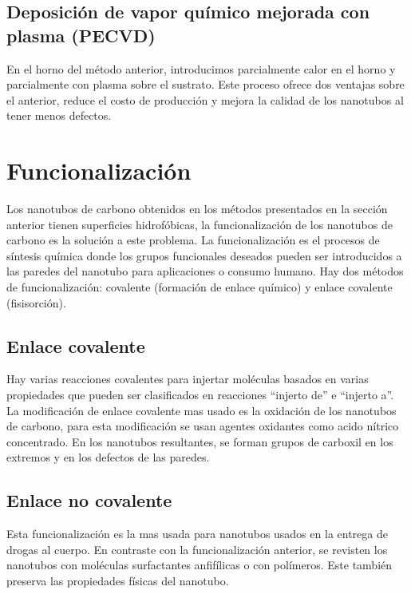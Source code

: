 \subsection{Deposición de vapor químico mejorada con plasma (PECVD)}

En el horno del método anterior, introducimos parcialmente calor en el horno y parcialmente con plasma sobre el sustrato. Este proceso ofrece dos ventajas sobre el anterior, reduce el costo de producción y mejora la calidad de los nanotubos al tener menos defectos.

\section{Funcionalización}

Los nanotubos de carbono obtenidos en los métodos presentados en la sección anterior tienen superficies hidrofóbicas, la funcionalización de los nanotubos de carbono es la solución a este problema. La funcionalización es el procesos de síntesis química donde los grupos funcionales deseados pueden ser introducidos a las paredes del nanotubo para aplicaciones o consumo humano. Hay dos métodos de funcionalización: covalente (formación de enlace químico) y enlace covalente (fisisorción)\cite{KAUR2019}.

\subsection{Enlace covalente}

Hay varias reacciones covalentes para injertar moléculas basados en varias propiedades que pueden ser clasificados en reacciones ``injerto de'' e ``injerto a''. La modificación de enlace covalente mas usado es la oxidación de los nanotubos de carbono, para esta modificación se usan agentes oxidantes como acido nítrico concentrado. En los nanotubos resultantes, se forman grupos de carboxil en los extremos y en los defectos de las paredes.

\subsection{Enlace no covalente}

Esta funcionalización es la mas usada para nanotubos usados en la entrega de drogas al cuerpo. En contraste con la funcionalización anterior, se revisten los nanotubos con moléculas surfactantes anfifílicas o con polímeros. Este también preserva las propiedades físicas del nanotubo.

